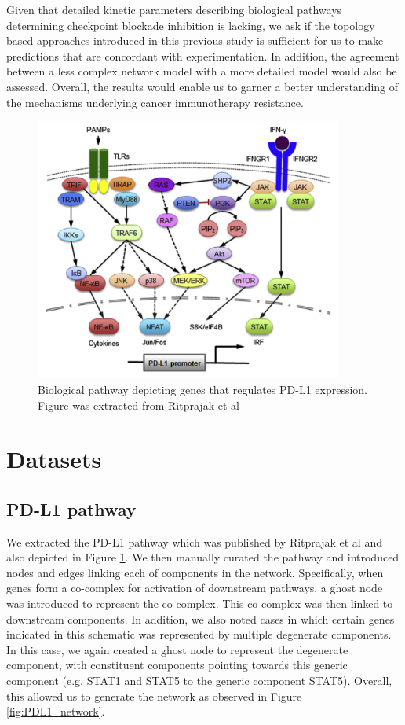 \documentclass{article}
\begin{document}
Given that detailed kinetic parameters describing biological pathways determining checkpoint blockade inhibition is lacking, we ask if the topology based approaches introduced in this previous study is sufficient for us to make predictions that are concordant with experimentation. In addition, the agreement between a less complex network model with a more detailed model would also be assessed. Overall, the results would enable us to garner a better understanding of the mechanisms underlying cancer immunotherapy resistance.


\begin{figure}
    \includegraphics[width = 0.9\textwidth]{Images/PD-L1_pathway.png}
    \caption{Biological pathway depicting genes that regulates PD-L1 expression. Figure was extracted from Ritprajak et al \cite{ritprajak2015intrinsic}}
    \label{fig:PDL1_biologicalpathway}
\end{figure}



\section{Datasets}
\subsection{PD-L1 pathway}

We extracted the PD-L1 pathway which was published by Ritprajak et al \cite{ritprajak2015intrinsic} and also depicted in Figure \ref{fig:PDL1_biologicalpathway}. We then manually curated the pathway and introduced nodes and edges linking each of components in the network. Specifically, when genes form a co-complex for activation of downstream pathways, a ghost node was introduced to represent the co-complex. This co-complex was then linked to downstream components. In addition, we also noted cases in which certain genes indicated in this schematic was represented by multiple degenerate components. In this case, we again created a ghost node to represent the degenerate component, with  constituent components pointing towards this generic component (e.g. STAT1 and STAT5 to the generic component STAT5). Overall, this allowed us to generate the network as observed in Figure \ref{fig:PDL1_network}.
\end{document}
